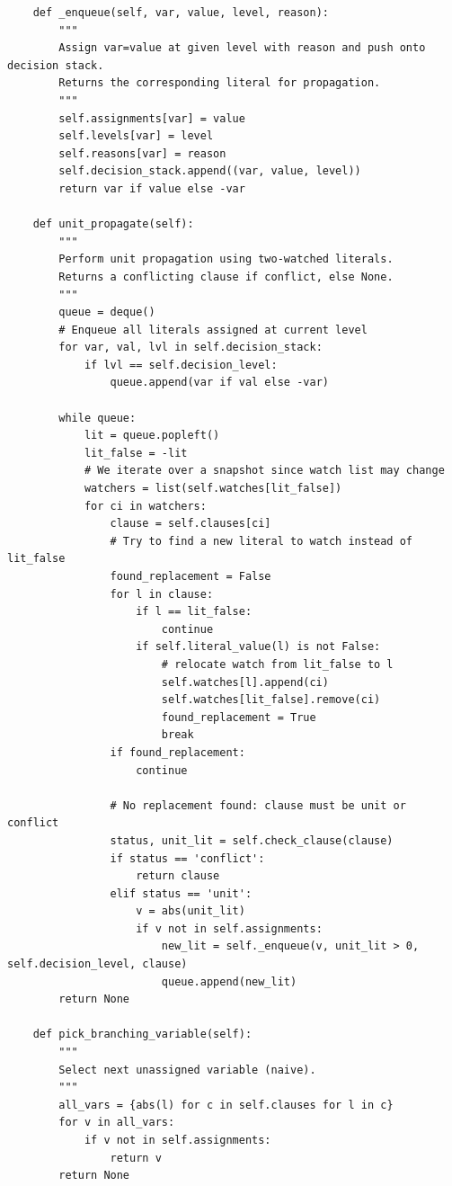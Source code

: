 \begin{lstlisting}
    def _enqueue(self, var, value, level, reason):
        """
        Assign var=value at given level with reason and push onto decision stack.
        Returns the corresponding literal for propagation.
        """
        self.assignments[var] = value
        self.levels[var] = level
        self.reasons[var] = reason
        self.decision_stack.append((var, value, level))
        return var if value else -var

    def unit_propagate(self):
        """
        Perform unit propagation using two-watched literals.
        Returns a conflicting clause if conflict, else None.
        """
        queue = deque()
        # Enqueue all literals assigned at current level
        for var, val, lvl in self.decision_stack:
            if lvl == self.decision_level:
                queue.append(var if val else -var)

        while queue:
            lit = queue.popleft()
            lit_false = -lit
            # We iterate over a snapshot since watch list may change
            watchers = list(self.watches[lit_false])
            for ci in watchers:
                clause = self.clauses[ci]
                # Try to find a new literal to watch instead of lit_false
                found_replacement = False
                for l in clause:
                    if l == lit_false:
                        continue
                    if self.literal_value(l) is not False:
                        # relocate watch from lit_false to l
                        self.watches[l].append(ci)
                        self.watches[lit_false].remove(ci)
                        found_replacement = True
                        break
                if found_replacement:
                    continue

                # No replacement found: clause must be unit or conflict
                status, unit_lit = self.check_clause(clause)
                if status == 'conflict':
                    return clause
                elif status == 'unit':
                    v = abs(unit_lit)
                    if v not in self.assignments:
                        new_lit = self._enqueue(v, unit_lit > 0, self.decision_level, clause)
                        queue.append(new_lit)
        return None

    def pick_branching_variable(self):
        """
        Select next unassigned variable (naive).
        """
        all_vars = {abs(l) for c in self.clauses for l in c}
        for v in all_vars:
            if v not in self.assignments:
                return v
        return None


\end{lstlisting}
